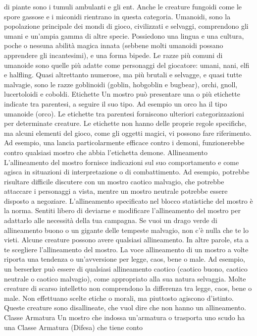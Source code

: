 \begin{multicols}{2}
di piante sono i tumuli ambulanti e gli ent. Anche le
creature fungoidi come le spore gassose e i miconidi
rientrano in questa categoria.
Umanoidi, sono la popolazione principale dei mondi di
gioco, civilizzati e selvaggi, comprendono gli umani e
un’ampia gamma di altre specie. Possiedono una
lingua e una cultura, poche o nessuna abilità magica
innata (sebbene molti umanoidi possano apprendere gli
incantesimi), e una forma bipede. Le razze più comuni
di umanoide sono quelle più adatte come personaggi
del giocatore: umani, nani, elfi e halfling. Quasi
altrettanto numerose, ma più brutali e selvagge, e quasi
tutte malvagie, sono le razze goblinoidi (goblin,
hobgoblin e bugbear), orchi, gnoll, lucertoloidi e coboldi.
Etichette
Un mostro può presentare una o più etichette indicate
tra parentesi, a seguire il suo tipo. Ad esempio un orco
ha il tipo umanoide (orco). Le etichette tra parentesi
forniscono ulteriori categorizzazioni per determinate
creature. Le etichette non hanno delle proprie regole
specifiche, ma alcuni elementi del gioco, come gli
oggetti magici, vi possono fare riferimento. Ad esempio,
una lancia particolarmente efficace contro i demoni,
funzionerebbe contro qualsiasi mostro che abbia
l’etichetta demone.
Allineamento
L’allineamento del mostro fornisce indicazioni sul suo
comportamento e come agisca in situazioni di
interpretazione o di combattimento. Ad esempio,
potrebbe risultare difficile discutere con un mostro
caotico malvagio, che potrebbe attaccare i personaggi
a vista, mentre un mostro neutrale potrebbe essere
disposto a negoziare.
L’allineamento specificato nel blocco statistiche del
mostro è la norma. Sentiti libero di deviarne e
modificare l’allineamento del mostro per adattarlo alle
necessità della tua campagna. Se vuoi un drago verde
di allineamento buono o un gigante delle tempeste
malvagio, non c’è nulla che te lo vieti.
Alcune creature possono avere qualsiasi
allineamento. In altre parole, sta a te scegliere
l’allineamento del mostro. La voce allineamento di un
mostro a volte riporta una tendenza o un’avversione per
legge, caos, bene o male. Ad esempio, un berserker
può essere di qualsiasi allineamento caotico (caotico
buono, caotico neutrale o caotico malvagio), come
appropriato alla sua natura selvaggia.
Molte creature di scarso intelletto non comprendono la
differenza tra legge, caos, bene o male. Non effettuano
scelte etiche o morali, ma piuttosto agiscono d’istinto.
Queste creature sono disallineate, che vuol dire che
non hanno un allineamento.
Classe Armatura
Un mostro che indossa un’armatura o trasporta uno
scudo ha una Classe Armatura (Difesa) che tiene conto

\end{multicols}
